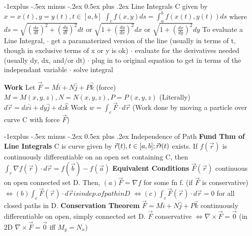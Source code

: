 \documentclass[10pt,landscape]{article}
\makeatletter
\renewcommand{\subsection}{\@startsection{subsection}{2}{0mm}%
                                {-1explus -.5ex minus -.2ex}%
                                {0.5ex plus .2ex}%
                                {\normalfont\normalsize\bfseries}}
\makeatother
\begin{document}
\begin{multicols*}{5}
\subsection{Line Integrals}
C given by $x = x(t), y = y(t), t\in [a,b]$\newline 
$ \int_cf(x,y)ds = \int_a^bf(x(t), y(t)) ds $\newline
where $ ds = \sqrt{(\frac{dx}{dt})^2+(\frac{dy}{dt})^2} dt $\newline
or $ \sqrt{1+(\frac{dy}{dx})^2} dx $\newline
or $ \sqrt{1+(\frac{dx}{dy})^2} dy $\newline
To evaluate a Line Integral,\newline
$\cdot$ get a paramaterized version of the line (usually in terms of t, though in exclusive terms of x or y is ok)\newline
$\cdot$ evaluate for the derivatives needed (usually dy, dx, and/or dt)\newline
$\cdot$ plug in to original equation to get in terms of the independant variable\newline
$\cdot$ solve integral\newline

\textbf{Work}\newline
Let $ \vec{F} = M\hat{i}+N\hat{j}+P\hat{k} $ (force) $ M=M(x,y,z), N=N(x,y,z), P=P(x,y,z) $\newline
(Literally)$ d\vec{r} = dx\hat{i}+dy\hat{j}+dz\hat{k} $\newline
Work $ w = \int_c\vec{F}\cdot d\vec{r} $\newline
(Work done by moving a particle over curve C with force $ \vec{F} $)

\subsection{Independence of Path}
\textbf{Fund Thm of Line Integrals}\newline
C is curve given by $ \vec{r}(t), t\in[a,b];\newline \vec{r}\prime(t) $ exists. If $ f(\vec{r}) $ is continuously differentiable on an open set containing C, then $ \int_c\nabla f(\vec{r}) \cdot d\vec{r} = f(\vec{b}) - f(\vec{a}) $\newline
\textbf{Equivalent Conditions}\newline
$ \vec{F}(\vec{r}) $ continuous on open connected set D. Then,\newline
$ (a) \vec{F} = \nabla f $ for some fn f. (if $ \vec{F} $ is conservative)
$ \Leftrightarrow (b) \int_c\vec{F}(\vec{r})\cdot d\vec{r} is indep. of path in D $\newline
$ \Leftrightarrow (c) \int_c\vec{F}(\vec{r})\cdot d\vec{r} = 0 $ for all closed paths in D.\newline
\textbf{Conservation Theorem}\newline
$ \vec{F} = M\hat{i}+N\hat{j}+P\hat{k} $ continuously differentiable on open, simply connected set D.\newline
$ \vec{F} $ conservative $ \Leftrightarrow \nabla\times\vec{F} = \vec{0} $ \newline
(in 2D $ \nabla\times\vec{F}=\vec{0} $ iff $ M_y = N_x$)


\end{multicols*}
\end{document}
